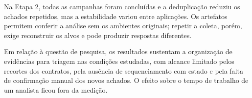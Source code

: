 Na Etapa 2, todas as campanhas foram concluídas e a deduplicação reduziu os
achados repetidos, mas a estabilidade variou entre aplicações. Os artefatos
permitem conferir a análise sem os ambientes originais; repetir a coleta, porém,
exige reconstruir os alvos e pode produzir respostas diferentes.

Em relação à questão de pesquisa, os resultados sustentam a organização de
evidências para triagem nas condições estudadas, com alcance limitado pelos
recortes dos contratos, pela ausência de sequenciamento com estado e pela falta
de confirmação manual dos novos achados. O efeito sobre o tempo de trabalho de
um analista ficou fora da medição.
